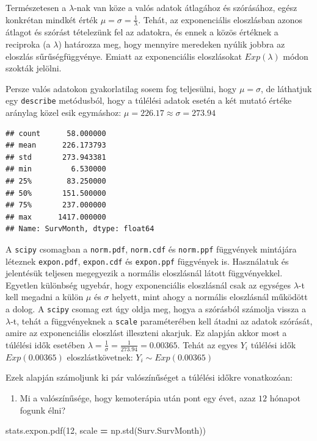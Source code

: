\documentclass[
]{book}
\newenvironment{Shaded}{\begin{snugshade}}{\end{snugshade}}
\newcommand{\DecValTok}[1]{\textcolor[rgb]{0.00,0.00,0.81}{#1}}
\newcommand{\NormalTok}[1]{#1}
\newcommand{\OperatorTok}[1]{\textcolor[rgb]{0.81,0.36,0.00}{\textbf{#1}}}
\providecommand{\tightlist}{%
  \setlength{\itemsep}{0pt}\setlength{\parskip}{0pt}}
\begin{document}
Természetesen a \(\lambda\)-nak van köze a valós adatok átlagához és szórásához, egész konkrétan mindkét érték \(\mu=\sigma=\frac{1}{\lambda}\). Tehát, az exponenciális eloszlásban azonos átlagot és szórást tételezünk fel az adatokra, és ennek a közös értéknek a reciproka (a \(\lambda\)) határozza meg, hogy mennyire meredeken nyúlik jobbra az eloszlás sűrűségfüggvénye. Emiatt az exponenciális eloszlásokat \(Exp(\lambda)\) módon szokták jelölni.

Persze valós adatokon gyakorlatilag sosem fog teljesülni, hogy \(\mu=\sigma\), de láthatjuk egy \texttt{describe} metódusból, hogy a túlélési adatok esetén a két mutató értéke aránylag közel esik egymáshoz: \(\mu=226.17 \approx \sigma=273.94\)

\begin{verbatim}
## count      58.000000
## mean      226.173793
## std       273.943381
## min         6.530000
## 25%        83.250000
## 50%       151.500000
## 75%       237.000000
## max      1417.000000
## Name: SurvMonth, dtype: float64
\end{verbatim}

A \texttt{scipy} csomagban a \texttt{norm.pdf}, \texttt{norm.cdf} és \texttt{norm.ppf} függvények mintájára léteznek \texttt{expon.pdf}, \texttt{expon.cdf} és \texttt{expon.ppf} függvények is. Használatuk és jelentésük teljesen megegyezik a normális eloszlásnál látott függvényekkel. Egyetlen különbség ugyebár, hogy exponenciális eloszlásnál csak az egységes \(\lambda\)-t kell megadni a külön \(\mu\) és \(\sigma\) helyett, mint ahogy a normális eloszlásnál működött a dolog.
A \texttt{scipy} csomag ezt úgy oldja meg, hogya a szórásból számolja vissza a \(\lambda\)-t, tehát a függvényeknek a \texttt{scale} paraméterében kell átadni az adatok szórását, amire az exponenciális eloszlást illeszteni akarjuk.
Ez alapján akkor most a túlélési idők esetében \(\lambda=\frac{1}{\sigma}=\frac{1}{273.94}=0.00365\). Tehát az egyes \(Y_i\) túlélési idők \(Exp(0.00365)\) eloszlástkövetnek: \(Y_i \sim Exp(0.00365)\)

Ezek alapján számoljunk ki pár valószínűséget a túlélési időkre vonatkozóan:

\begin{enumerate}
\def\labelenumi{\arabic{enumi}.}
\tightlist
\item
  Mi a valószínűsége, hogy kemoterápia után pont egy évet, azaz \(12\) hónapot fogunk élni?
\end{enumerate}

\begin{Shaded}
\begin{Highlighting}[]
\NormalTok{stats.expon.pdf(}\DecValTok{12}\NormalTok{, scale }\OperatorTok{=}\NormalTok{ np.std(Surv.SurvMonth))}
\end{Highlighting}
\end{Shaded}
\end{document}
